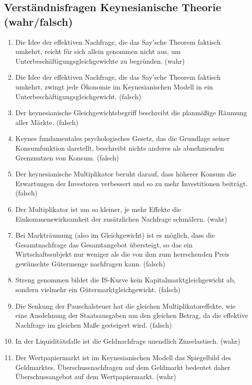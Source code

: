\documentclass{scrartcl}
\begin{document}
\subsection{Verständnisfragen Keynesianische Theorie (wahr/falsch)}
\begin{enumerate}
	\item Die Idee der effektiven Nachfrage, die das Say'sche Theorem faktisch umkehrt, reicht für sich allein genommen nicht aus, um Unterbeschäftigungsgleichgewichte zu begründen. (wahr)
	\item Die Idee der effektiven Nachfrage, die das Say’sche Theorem faktisch umkehrt, zwingt jede Ökonomie im Keynesianischen Modell in ein Unterbeschäftigungsgleichgewicht. (falsch)
	\item Der keynesianische Gleichgewichtsbegriff beschreibt die planmäßige Räumung aller Märkte. (falsch)
	\item Keynes fundamentales psychologisches Gesetz, das die Grundlage seiner Konsumfunktion darstellt, beschreibt nichts anderes als abnehmenden Grenznutzen von Konsum. (falsch)
	\item Der keynesianische Multiplikator beruht darauf, dass höherer Konsum die Erwartungen der Investoren verbessert und so zu mehr Investitionen beiträgt. (falsch)
	\item Der Multiplikator ist um so kleiner, je mehr Effekte die Einkommenswirksamkeit der zusätzlichen Nachfrage schmälern. (wahr)
	\item Bei Markträumung (also im Gleichgewicht) ist es möglich, dass die Gesamtnachfrage das Gesamtangebot übersteigt, so das ein Wirtschaftssubjekt nur weniger als die von ihm zum herrschenden Preis gewünschte Gütermenge nachfragen kann. (falsch)
	\item Streng genommen bildet die IS-Kurve kein Kapitalmarktgleichgewicht ab, sondern vielmehr ein Gütermarktgleichgewicht. (falsch)
	\item Die Senkung der Pauschalsteuer hat die gleichen Multiplikatoreffekte, wie eine Ausdehnung der Staatsausgaben um den gleichen Betrag, da die effektive Nachfrage im gleichen Maße gesteigert wird. (falsch)
	\item In der Liquiditätsfalle ist die Geldnachfrage unendlich Zinselastisch. (wahr)
	\item Der Wertpapiermarkt ist im Keynesianischen Modell das Spiegelbild des Geldmarktes. Überschussnachfragen auf dem Geldmarkt bedeutet daher Überschussangebot auf dem Wertpapiermarkt. (wahr)
\end{enumerate}
\newpage
\end{document}
